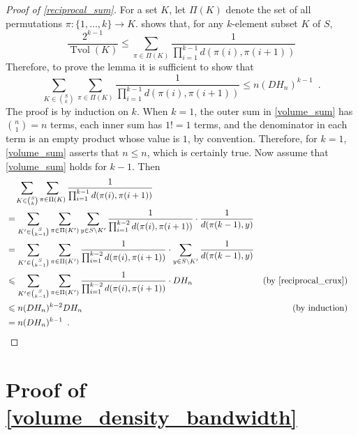 \documentclass{patmorin}
\renewcommand{\le}{\leqslant}
\DeclareMathOperator{\tvol}{Tvol}
\begin{document}
\begin{proof}[Proof of \cref{reciprocal_sum}]
  For a set $K$, let $\Pi(K)$ denote the set of all permutations $\pi:\{1,\ldots,k\}\to K$.
  \citet[Lemma~17]{feige:approximating} shows that, for any $k$-element subset $K$ of $S$,
  \[
    \frac{2^{k-1}}{\tvol(K)} \le \sum_{\pi\in\Pi(K)}\frac{1}{\prod_{i=1}^{k-1}d(\pi(i),\pi(i+1))}
  \]
  Therefore, to prove the lemma it is sufficient to show that
  \begin{equation}
    \sum_{K\in\binom{S}{k}}\sum_{\pi\in\Pi(K)}\frac{1}{\prod_{i=1}^{k-1}d(\pi(i),\pi(i+1))} \le n(DH_n)^{k-1} \enspace .
    \label{volume_sum}
  \end{equation}
  The proof is by induction on $k$.  When $k=1$, the outer sum in \cref{volume_sum} has $\binom{n}{1}=n$ terms, each inner sum has $1!=1$ terms, and the denominator in each term is an empty product whose value is $1$, by convention.  Therefore, for $k=1$, \cref{volume_sum} asserts that $n \le n$, which is certainly true.  Now assume that \cref{volume_sum} holds for $k-1$.  Then
  \begin{align*}
    & \quad \sum_{K\in\binom{S}{k}}\sum_{\pi\in\Pi(K)}\frac{1}{\prod_{i=1}^{k-1}d(\pi(i),\pi(i+1))} \\
    & = \sum_{K'\in\binom{S}{k-1}}\sum_{\pi\in\Pi(K')}\sum_{y\in S\setminus K'}\frac{1}{\prod_{i=1}^{k-2}d(\pi(i),\pi(i+1))}\cdot\frac{1}{d(\pi(k-1),y)} \\
    & = \sum_{K'\in\binom{S}{k-1}}\sum_{\pi\in\Pi(K')}\frac{1}{\prod_{i=1}^{k-2}d(\pi(i),\pi(i+1))}\cdot\sum_{y\in S\setminus K'}\frac{1}{d(\pi(k-1),y)} \\
    & \le \sum_{K'\in\binom{S}{k-1}}\sum_{\pi\in\Pi(K')}\frac{1}{\prod_{i=1}^{k-2}d(\pi(i),\pi(i+1))}\cdot DH_n & \text{(by \cref{reciprocal_crux})}\\
    & \le n(DH_n)^{k-2}DH_n & \text{(by induction)}\\
    & = n(DH_n)^{k-1} \enspace . & & \qedhere
  \end{align*}
\end{proof}

\section{Proof of \texorpdfstring{\cref{volume_density_bandwidth}}{Lemma?}}
\label{volume_density_bandwidth_section}

\volumedensitybandwidth*
\end{document}

